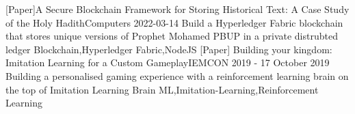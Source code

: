 

\begin{projects}
		\project
	{[Paper]A Secure Blockchain Framework for Storing Historical Text: A Case Study of the Holy Hadith}{Computers
2022-03-14}
	{}
	{Build a Hyperledger Fabric blockchain that stores unique versions of Prophet Mohamed PBUP in a private distrubted ledger }
	{Blockchain,Hyperledger Fabric,NodeJS}	
			\project
	{[Paper] Building your kingdom: Imitation Learning for a Custom Gameplay}{IEMCON 2019 - 17 October 2019}
	{\paperSymbol{ }
	}
	{Building a personalised gaming experience with a reinforcement learning brain on the top of Imitation Learning Brain}
	{ML,Imitation-Learning,Reinforcement Learning}
\end{projects}